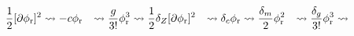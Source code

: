 \newcommand\phir{\phi_\text r}

\begin{align*}
    \frac12 [\partial \phir]^2
    &\leadsto
    - c \phir
    &\leadsto
    \frac{g}{3!} \phir^3
    &\leadsto
    \frac12 \delta_Z [\partial \phir]^2
    &\leadsto
    \delta_c \phir
    &\leadsto
    \frac{\delta_m}2\phir^2
    &\leadsto
    \frac{\delta_g}{3!} \phir^3
    &\leadsto
\end{align*}

